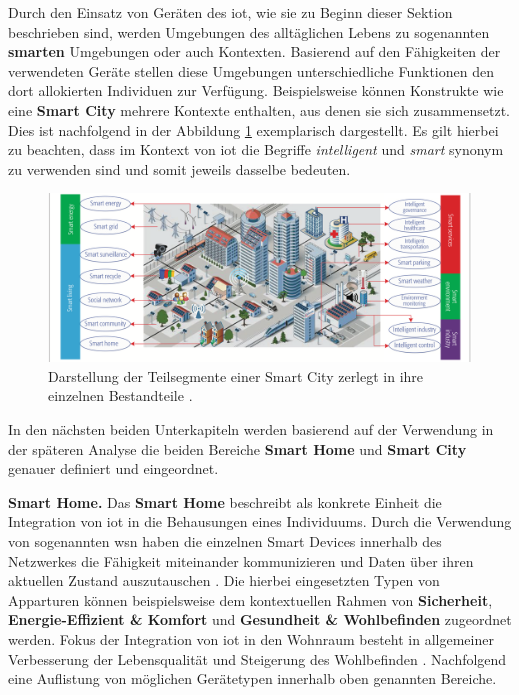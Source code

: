 Durch den Einsatz von Geräten des \ac{iot}, wie sie zu Beginn dieser Sektion beschrieben sind, werden Umgebungen des alltäglichen Lebens zu sogenannten \textbf{smarten} Umgebungen oder auch Kontexten. Basierend auf den Fähigkeiten der verwendeten Geräte stellen diese Umgebungen unterschiedliche Funktionen den dort allokierten Individuen zur Verfügung. Beispielsweise können Konstrukte wie eine \textbf{Smart City} mehrere Kontexte enthalten, aus denen sie sich zusammensetzt. Dies ist nachfolgend in der Abbildung \ref{fig:smart-applications} exemplarisch dargestellt. Es gilt hierbei zu beachten, dass im Kontext von \ac{iot} die Begriffe \textit{intelligent} und \textit{smart} synonym zu verwenden sind und somit jeweils dasselbe bedeuten.

\begin{figure}
\includegraphics[width=\textwidth]{fundamentals/pictures/Smart_Applications}
\caption{Darstellung der Teilsegmente einer Smart City zerlegt in ihre einzelnen Bestandteile \cite{Zhang2017}.}
\label{fig:smart-applications}
\end{figure}

\noindent In den nächsten beiden Unterkapiteln werden basierend auf der Verwendung in der späteren Analyse die beiden Bereiche \textbf{Smart Home} und \textbf{Smart City} genauer definiert und eingeordnet.


\noindent \textbf{Smart Home.}
Das \textbf{Smart Home} beschreibt als konkrete Einheit die Integration von \ac{iot} in die Behausungen eines Individuums. Durch die Verwendung von sogenannten \acl{wsn} haben die einzelnen Smart Devices innerhalb des Netzwerkes die Fähigkeit miteinander kommunizieren und Daten über ihren aktuellen Zustand auszutauschen \cite{Biljana2017}. Die hierbei eingesetzten Typen von Apparturen können beispielsweise dem kontextuellen Rahmen von \textbf{Sicherheit}, \textbf{Energie-Effizient \& Komfort} und \textbf{Gesundheit \& Wohlbefinden} zugeordnet werden. Fokus der Integration von \ac{iot} in den Wohnraum besteht in allgemeiner Verbesserung der Lebensqualität und Steigerung des Wohlbefinden \cite{Bastos2018}. Nachfolgend eine Auflistung von möglichen Gerätetypen innerhalb oben genannten Bereiche.

